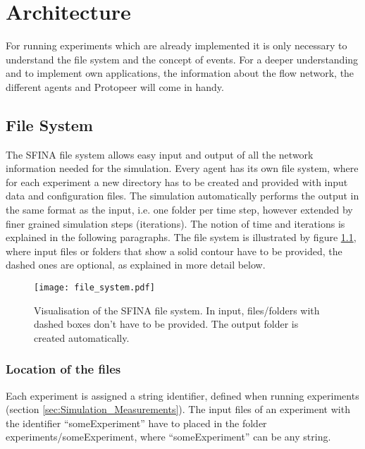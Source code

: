 \documentclass[11pt,fleqn]{book} %
\begin{document}
\chapter{Architecture}

For running experiments which are already implemented it is only necessary to understand the file system and the concept of events. For a deeper understanding and to implement own applications, the information about the flow network, the different agents and Protopeer will come in handy. 


\section{File System}\label{sec:file_system}
The SFINA file system allows easy input and output of all the network information needed for the simulation. Every agent has its own file system, where for each experiment a new directory has to be created and provided with input data and configuration files. The simulation automatically performs the output in the same format as the input, i.e. one folder per time step, however extended by finer grained simulation steps (iterations). The notion of time and iterations is explained in the following paragraphs. The file system is illustrated by figure \ref{fig:file_system}, where input files or folders that show a solid contour have to be provided, the dashed ones are optional, as explained in more detail below.

\begin{figure}[h]
\centering\texttt{[image: file\_system.pdf]}
\caption{Visualisation of the SFINA file system. In input, files/folders with dashed boxes don't have to be provided. The output folder is created automatically.}
\label{fig:file_system}
\end{figure}

\subsection{Location of the files}
Each experiment is assigned a string identifier, defined when running experiments (section \ref{sec:Simulation_Measurements}). The input files of an experiment with the identifier “someExperiment” have to placed in the folder experiments/someExperiment, where “someExperiment” can be any string.
\end{document}
